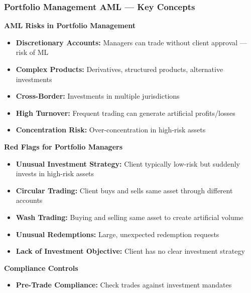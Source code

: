 \documentclass[12pt,aspectratio=169]{beamer}
\renewcommand{\scriptsize}{\fontsize{4.5}{5.5}\selectfont}
\begin{document}
	\begin{frame}
		\frametitle{\fontsize{11}{13}\selectfont \textbf{Portfolio Management AML — Key Concepts}}
		\begin{block}{\fontsize{7}{9}\selectfont \textbf{AML Risks in Portfolio Management}}
			\scriptsize
			\begin{itemize}
				\item \textbf{Discretionary Accounts:} Managers can trade without client approval — risk of ML
				\item \textbf{Complex Products:} Derivatives, structured products, alternative investments
				\item \textbf{Cross-Border:} Investments in multiple jurisdictions
				\item \textbf{High Turnover:} Frequent trading can generate artificial profits/losses
				\item \textbf{Concentration Risk:} Over-concentration in high-risk assets
			\end{itemize}
		\end{block}
		\vspace{0.02cm}
		\begin{block}{\fontsize{7}{9}\selectfont \textbf{Red Flags for Portfolio Managers}}
			\scriptsize
			\begin{itemize}
				\item \textbf{Unusual Investment Strategy:} Client typically low-risk but suddenly invests in high-risk assets
				\item \textbf{Circular Trading:} Client buys and sells same asset through different accounts
				\item \textbf{Wash Trading:} Buying and selling same asset to create artificial volume
				\item \textbf{Unusual Redemptions:} Large, unexpected redemption requests
				\item \textbf{Lack of Investment Objective:} Client has no clear investment strategy
			\end{itemize}
		\end{block}
		\vspace{0.02cm}
		\begin{block}{\fontsize{7}{9}\selectfont \textbf{Compliance Controls}}
			\scriptsize
			\begin{itemize}
				\item \textbf{Pre-Trade Compliance:} Check trades against investment mandates

\end{itemize}
\end{block}
\end{frame}
\end{document}
